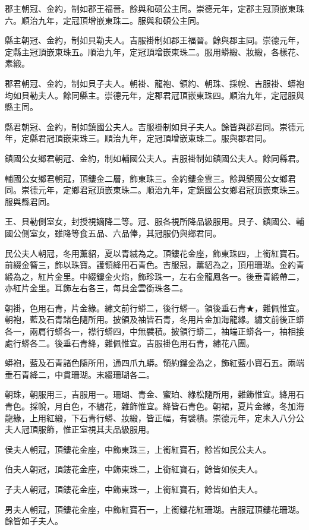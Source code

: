 \begin{pinyinscope}
郡主朝冠、金約，制如郡王福晉。餘與和碩公主同。崇德元年，定郡主冠頂嵌東珠六。順治九年，定冠頂增嵌東珠二。服與和碩公主同。

縣主朝冠、金約，制如貝勒夫人。吉服褂制如郡王福晉。餘與郡主同。崇德元年，定縣主冠頂嵌東珠五。順治九年，定冠頂增嵌東珠二。服用蟒緞、妝緞，各樣花、素緞。

郡君朝冠、金約，制如貝子夫人。朝褂、龍袍、領約、朝珠、採帨、吉服褂、蟒袍均如貝勒夫人。餘同縣主。崇德元年，定郡君冠頂嵌東珠四。順治九年，定冠服與縣主同。

縣君朝冠、金約，制如鎮國公夫人。吉服褂制如貝子夫人。餘皆與郡君同。崇德元年，定縣君冠頂嵌東珠三。順治九年，定冠頂增嵌東珠二。服與郡君同。

鎮國公女鄉君朝冠、金約，制如輔國公夫人。吉服褂制如鎮國公夫人。餘同縣君。

輔國公女鄉君朝冠，頂鏤金二層，飾東珠三。金約鏤金雲三。餘與鎮國公女鄉君同。崇德元年，定鄉君冠頂嵌東珠二。順治九年，定鎮國公女鄉君冠頂嵌東珠三。服與縣君同。

王、貝勒側室女，封授視嫡降二等。冠、服各視所降品級服用。貝子、鎮國公、輔國公側室女，雖降等食五品、六品俸，其冠服仍與鄉君同。

民公夫人朝冠，冬用薰貂，夏以青絨為之。頂鏤花金座，飾東珠四，上銜紅寶石。前綴金簪三，飾以珠寶。護領絳用石青色。吉服冠，薰貂為之，頂用珊瑚。金約青緞為之，紅片金里。中綴鏤金火焰，飾珍珠一，左右金龍鳳各一。後垂青緞帶二，亦紅片金里。耳飾左右各三，每具金雲銜珠各二。

朝褂，色用石青，片金緣。繡文前行蟒二，後行蟒一。領後垂石青★，雜佩惟宜。朝袍，藍及石青諸色隨所用。披領及袖皆石青，冬用片金加海龍緣。繡文前後正蟒各一，兩肩行蟒各一，襟行蟒四，中無襞積。披領行蟒二，袖端正蟒各一，袖相接處行蟒各二。後垂石青絳，雜佩惟宜。吉服褂色用石青，繡花八團。

蟒袍，藍及石青諸色隨所用，通四爪九蟒。領約鏤金為之，飾紅藍小寶石五。兩端垂石青絳二，中貫珊瑚。末綴珊瑚各二。

朝珠，朝服用三，吉服用一。珊瑚、青金、蜜珀、綠松隨所用，雜飾惟宜。絳用石青色。採帨，月白色，不繡花，雜飾惟宜。絳皆石青色。朝裙，夏片金緣，冬加海龍緣，上用紅緞，下石青行蟒、妝緞，皆正幅，有襞積。崇德元年，定未入八分公夫人冠頂服飾，惟正室視其夫品級服用。

侯夫人朝冠，頂鏤花金座，中飾東珠三，上銜紅寶石，餘皆如民公夫人。

伯夫人朝冠，頂鏤花金座，中飾東珠二，上銜紅寶石，餘皆如侯夫人。

子夫人朝冠，頂鏤花金座，中飾東珠一，上銜紅寶石，餘皆如伯夫人。

男夫人朝冠，頂鏤花金座，中飾紅寶石一，上銜鏤花紅珊瑚。吉服冠頂鏤花珊瑚。餘皆如子夫人。


\end{pinyinscope}
